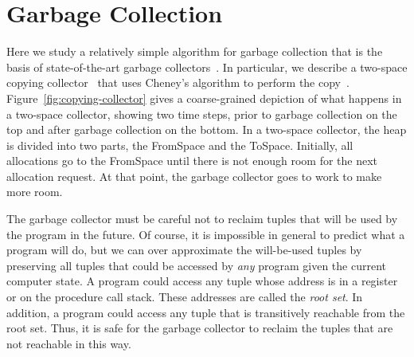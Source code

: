 \documentclass[11pt]{book}
\begin{document}
\section{Garbage Collection}
\label{sec:GC}

Here we study a relatively simple algorithm for garbage collection
that is the basis of state-of-the-art garbage
collectors~\citep{Lieberman:1983aa,Ungar:1984aa,Jones:1996aa,Detlefs:2004aa,Dybvig:2006aa,Tene:2011kx}. In
particular, we describe a two-space copying
collector~\citep{Wilson:1992fk} that uses Cheney's algorithm to
perform the
copy~\citep{Cheney:1970aa}. Figure~\ref{fig:copying-collector} gives a
coarse-grained depiction of what happens in a two-space collector,
showing two time steps, prior to garbage collection on the top and
after garbage collection on the bottom. In a two-space collector, the
heap is divided into two parts, the FromSpace and the
ToSpace. Initially, all allocations go to the FromSpace until there is
not enough room for the next allocation request. At that point, the
garbage collector goes to work to make more room.


The garbage collector must be careful not to reclaim tuples that will
be used by the program in the future. Of course, it is impossible in
general to predict what a program will do, but we can over approximate
the will-be-used tuples by preserving all tuples that could be
accessed by \emph{any} program given the current computer state.  A
program could access any tuple whose address is in a register or on
the procedure call stack. These addresses are called the \emph{root
  set}. In addition, a program could access any tuple that is
transitively reachable from the root set. Thus, it is safe for the
garbage collector to reclaim the tuples that are not reachable in this
way.
\end{document}
